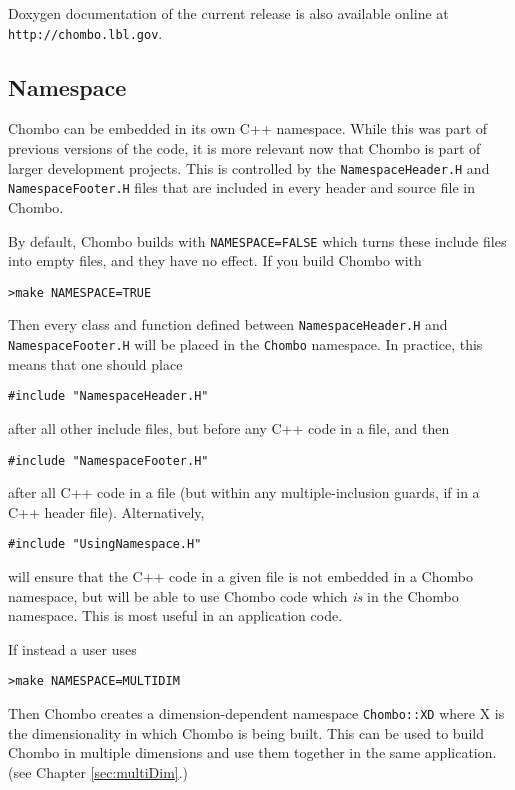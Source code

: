 Doxygen documentation of the current release is also available online
at {\tt http://chombo.lbl.gov}.


\subsection{Namespace}
\label{subsec:namespace}
Chombo can be embedded in its own C++ namespace.
While this was part of previous versions of the code, it is more relevant now that Chombo is 
part of larger development projects.  This is controlled by the {\tt NamespaceHeader.H} and
{\tt NamespaceFooter.H} files that are included in every header and source file in Chombo.
 
By default, Chombo builds with {\tt NAMESPACE=FALSE} which turns these include files into 
empty files, and they have no effect.  If you build Chombo with 

\begin{verbatim}
>make NAMESPACE=TRUE
\end{verbatim}

Then every class and function defined between {\tt NamespaceHeader.H}
and {\tt NamespaceFooter.H} will be placed in the {\tt Chombo}
namespace.  In practice, this means that one should place
\begin{verbatim}
#include "NamespaceHeader.H"
\end{verbatim} 
after all other include files, but before any C++ code in a file, and
then 
\begin{verbatim}
#include "NamespaceFooter.H"
\end{verbatim}
after all C++ code in a file (but within any multiple-inclusion
guards, if in a C++ header file). Alternatively, 
\begin{verbatim}
#include "UsingNamespace.H"
\end{verbatim}
will ensure that the C++ code in a given file is not embedded in a
Chombo namespace, but will be able to use Chombo code which {\it is}
in the Chombo namespace. This
is most useful in an application code. 

If instead a user uses

\begin{verbatim}
>make NAMESPACE=MULTIDIM
\end{verbatim}

Then Chombo creates a dimension-dependent namespace {\tt Chombo::XD}
where X is the dimensionality in which Chombo is being built.  This
can be used to build Chombo in multiple dimensions and use them
together in  the same application. (see Chapter \ref{sec:multiDim}.)
